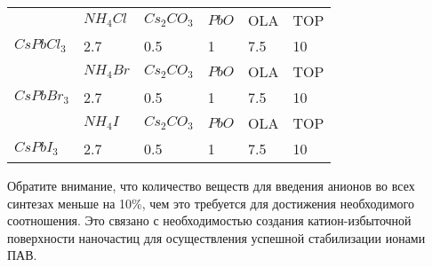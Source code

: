 \begin{longtable}{|p{2cm}|p{2.5cm}|p{3cm}|p{3cm}|p{1.5cm}|p{2cm}|}
    & \cellcolor[HTML]{C0C0C0}$NH_4Cl$ & \cellcolor[HTML]{C0C0C0}$Cs_2CO_3$ & \cellcolor[HTML]{C0C0C0}$PbO$ & \cellcolor[HTML]{C0C0C0}OLA & \cellcolor[HTML]{C0C0C0}TOP \\ \cline{2-6} \multirow{-2}{*}{$CsPbCl_3$} & 2.7 & 0.5 & 1 & 7.5 & 10 \\ \hline

    & \cellcolor[HTML]{C0C0C0}$NH_4Br$ & \cellcolor[HTML]{C0C0C0}$Cs_2CO_3$ & \cellcolor[HTML]{C0C0C0}$PbO$ & \cellcolor[HTML]{C0C0C0}OLA & \cellcolor[HTML]{C0C0C0}TOP \\ \cline{2-6} \multirow{-2}{*}{$CsPbBr_3$} & 2.7 & 0.5 & 1 & 7.5 & 10 \\ \hline

    & \cellcolor[HTML]{C0C0C0}$NH_4I$ & \cellcolor[HTML]{C0C0C0}$Cs_2CO_3$ & \cellcolor[HTML]{C0C0C0}$PbO$ & \cellcolor[HTML]{C0C0C0}OLA & \cellcolor[HTML]{C0C0C0}TOP \\ \cline{2-6} \multirow{-2}{*}{$CsPbI_3$} & 2.7 & 0.5 & 1 & 7.5 & 10 \\ \hline
\end{longtable}

Обратите внимание, что количество веществ для введения анионов во всех синтезах меньше на 10\%, чем это требуется для достижения необходимого соотношения. Это связано с необходимостью создания катион-избыточной поверхности наночастиц для осуществления успешной стабилизации ионами ПАВ.

